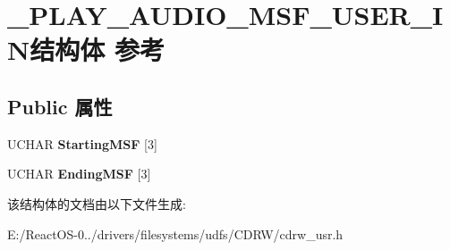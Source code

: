\hypertarget{struct___p_l_a_y___a_u_d_i_o___m_s_f___u_s_e_r___i_n}{}\section{\+\_\+\+P\+L\+A\+Y\+\_\+\+A\+U\+D\+I\+O\+\_\+\+M\+S\+F\+\_\+\+U\+S\+E\+R\+\_\+\+I\+N结构体 参考}
\label{struct___p_l_a_y___a_u_d_i_o___m_s_f___u_s_e_r___i_n}
\subsection*{Public 属性}
\begin{DoxyCompactItemize}
\item 
\mbox{\label{struct___p_l_a_y___a_u_d_i_o___m_s_f___u_s_e_r___i_n_ab47be85b54055a816788b769d8c9f83c}} 
U\+C\+H\+AR {\bfseries Starting\+M\+SF} \mbox{[}3\mbox{]}
\item 
\mbox{\label{struct___p_l_a_y___a_u_d_i_o___m_s_f___u_s_e_r___i_n_a5fc869df419b288e166b7186b50e6e4d}} 
U\+C\+H\+AR {\bfseries Ending\+M\+SF} \mbox{[}3\mbox{]}
\end{DoxyCompactItemize}


该结构体的文档由以下文件生成\+:\begin{DoxyCompactItemize}
\item 
E\+:/\+React\+O\+S-\/0../drivers/filesystems/udfs/\+C\+D\+R\+W/cdrw\+\_\+usr.\+h\end{DoxyCompactItemize}
